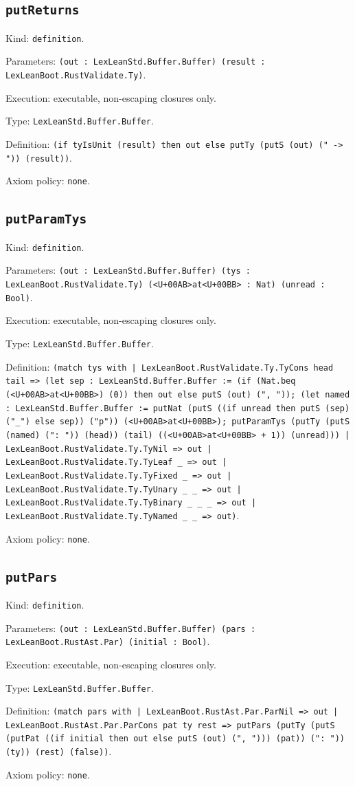 \documentclass[11pt]{article}
\begin{document}
\subsection*{\texttt{putReturns}}
\noindent Kind: \texttt{definition}.\par
\noindent Parameters: \texttt{(out : LexLeanStd.Buffer.Buffer) (result : LexLeanBoot.RustValidate.Ty)}.\par
\noindent Execution: executable, non-escaping closures only.\par
\noindent Type: \texttt{LexLeanStd.Buffer.Buffer}.\par
\noindent Definition: \texttt{(if tyIsUnit (result) then out else putTy (putS (out) (" -> ")) (result))}.\par
\noindent Axiom policy: \texttt{none}.\par
\subsection*{\texttt{putParamTys}}
\noindent Kind: \texttt{definition}.\par
\noindent Parameters: \texttt{(out : LexLeanStd.Buffer.Buffer) (tys : LexLeanBoot.RustValidate.Ty) (<U+00AB>at<U+00BB> : Nat) (unread : Bool)}.\par
\noindent Execution: executable, non-escaping closures only.\par
\noindent Type: \texttt{LexLeanStd.Buffer.Buffer}.\par
\noindent Definition: \texttt{(match tys with | LexLeanBoot.RustValidate.Ty.TyCons head tail => (let sep : LexLeanStd.Buffer.Buffer := (if (Nat.beq (<U+00AB>at<U+00BB>) (0)) then out else putS (out) (", ")); (let named : LexLeanStd.Buffer.Buffer := putNat (putS ((if unread then putS (sep) ("\_") else sep)) ("p")) (<U+00AB>at<U+00BB>); putParamTys (putTy (putS (named) (": ")) (head)) (tail) ((<U+00AB>at<U+00BB> + 1)) (unread))) | LexLeanBoot.RustValidate.Ty.TyNil => out | LexLeanBoot.RustValidate.Ty.TyLeaf \_ => out | LexLeanBoot.RustValidate.Ty.TyFixed \_ => out | LexLeanBoot.RustValidate.Ty.TyUnary \_ \_ => out | LexLeanBoot.RustValidate.Ty.TyBinary \_ \_ \_ => out | LexLeanBoot.RustValidate.Ty.TyNamed \_ \_ => out)}.\par
\noindent Axiom policy: \texttt{none}.\par
\subsection*{\texttt{putPars}}
\noindent Kind: \texttt{definition}.\par
\noindent Parameters: \texttt{(out : LexLeanStd.Buffer.Buffer) (pars : LexLeanBoot.RustAst.Par) (initial : Bool)}.\par
\noindent Execution: executable, non-escaping closures only.\par
\noindent Type: \texttt{LexLeanStd.Buffer.Buffer}.\par
\noindent Definition: \texttt{(match pars with | LexLeanBoot.RustAst.Par.ParNil => out | LexLeanBoot.RustAst.Par.ParCons pat ty rest => putPars (putTy (putS (putPat ((if initial then out else putS (out) (", "))) (pat)) (": ")) (ty)) (rest) (false))}.\par
\noindent Axiom policy: \texttt{none}.\par
\end{document}
